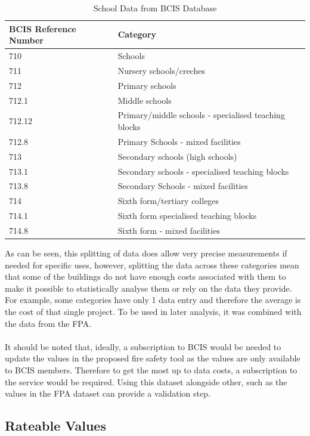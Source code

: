 \documentclass[table,a4paper,oneside]{book}
\begin{document}
\begin{table}[htbp]
	\begin{center}
	\begin{tabular}{ll}
		\toprule
		\textbf{BCIS Reference Number}	& \textbf{Category} \\
		\midrule
		710	&Schools	\\
		711	&Nursery schools/creches	\\
		712	&Primary schools	\\
		712.1	&Middle schools	\\
		712.12	&Primary/middle schools - specialised teaching blocks \\
		712.8	&Primary Schools - mixed facilities \\
		713	&Secondary schools (high schools)	\\
		713.1	&Secondary schools - specialised teaching blocks \\
		713.8	&Secondary Schools - mixed facilities \\
		714	&Sixth form/tertiary colleges	\\
		714.1	&Sixth form specialised teaching blocks \\
		714.8	&Sixth form - mixed facilities	\\
		\bottomrule
	\end{tabular}
	\end{center}
\caption{School Data from BCIS Database}
\label{tab:BCIS_School_Data}
\end{table}

As can be seen, this splitting of data does allow very precise measurements if needed for specific uses, however, splitting the data across these categories mean that some of the buildings do not have enough costs associated with them to make it possible to statistically analyse them or rely on the data they provide. For example, some categories have only 1 data entry and therefore the average is the cost of that single project. To be used in later analysis, it was combined with the data from the \ac{FPA}.
\\
\\
It should be noted that, ideally, a subscription to BCIS would be needed to update the values in the proposed fire safety tool as the values are only available to BCIS members. Therefore to get the most up to data costs, a subscription to the service would be required. Using this dataset alongside other, such as the values in the \ac{FPA} dataset can provide a validation step.

\subsection{Rateable Values}
\label{sec:Rateable Values}
\end{document}
